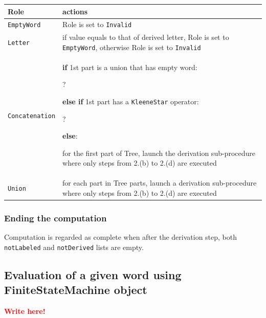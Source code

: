\documentclass{article}
\newcommand{\writehere}{\textbf{\textcolor{red}{Write here!}}}
\begin{document}
\vspace{10pt}
\noindent
\begin{tabularx}{\textwidth}{l|X}

Role & actions \\ \hline

\verb|EmptyWord| &

Role is set to \verb|Invalid| \\ \hline

\verb|Letter| &

if value equals to that of derived letter, Role is set to \verb|EmptyWord|, otherwise Role is set to
\verb|Invalid| \\ \hline

\verb|Concatenation| &

\textbf{if} 1st part is a union that has empty word:

?

\vspace{5pt}
\textbf{else if} 1st part has a \verb|KleeneStar| operator:

?

\vspace{5pt}
\textbf{else}:

for the first part of Tree, launch the derivation sub-procedure where only steps from 2.(b) to 2.(d)
are executed \\ \hline

\verb|Union| &

for each part in Tree parts, launch a derivation sub-procedure where only steps from 2.(b) to 2.(d)
are executed \\

\end{tabularx}

\subsubsection{Ending the computation}

Computation is regarded as complete when after the derivation step, both \verb|notLabeled| and
\verb|notDerived| lists are empty.

\subsection{Evaluation of a given word using FiniteStateMachine object}

\writehere
\end{document}
